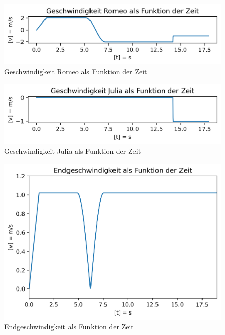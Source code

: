 \documentclass[../main.tex]{subfiles}
\begin{document}
    \begin{figure}[H]
        \begin{center}
            \centerline{\includegraphics[width=155mm]{./images/Inelastisch/GeschwindigkeitRomeo}}
            \caption{Geschwindigkeit Romeo als Funktion der Zeit}
            \label{fig:GeschwindigkeitRomeo}
        \end{center}
    \end{figure}

    \begin{figure}[H]
        \begin{center}
            \centerline{\includegraphics[width=155mm]{./images/Inelastisch/GeschwindigkeitJulia}}
            \caption{Geschwindigkeit Julia als Funktion der Zeit}
            \label{fig:GeschwindigkeitJulia}
        \end{center}
    \end{figure}



    \begin{figure}[H]
        \begin{center}
            \centerline{\includegraphics[width=155mm]{./images/Inelastisch/Endgeschwindigkeit}}
            \caption{Endgeschwindigkeit als Funktion der Zeit}
            \label{fig:Endgeschwindigkeit}
        \end{center}
    \end{figure}
\end{document}
